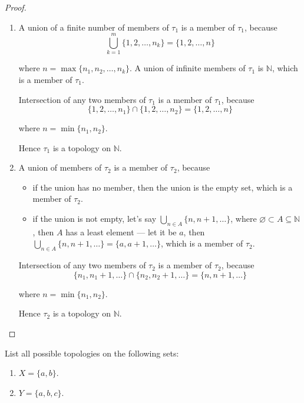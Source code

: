 \begin{proof}
	\begin{enumerate}[label={(\roman*)}]
		\item A union of a finite number of members of $\tau_{1}$ is a member of $\tau_{1}$, because
		      \[
			      \bigcup^{m}_{k=1} \{ 1, 2, \ldots, n_{k} \} = \{ 1, 2, \ldots, n \}
		      \]

		      where $n = \max\{ n_{1}, n_{2}, \ldots, n_{k} \}$. A union of infinite members of $\tau_{1}$ is $\mathbb{N}$, which is a member of $\tau_{1}$.

		      Intersection of any two members of $\tau_{1}$ is a member of $\tau_{1}$, because
		      \[
			      \{ 1, 2, \ldots, n_{1} \} \cap \{ 1, 2, \ldots, n_{2} \} = \{ 1, 2, \ldots, n \}
		      \]

		      where $n = \min\{ n_{1}, n_{2} \}$.

		      Hence $\tau_{1}$ is a topology on $\mathbb{N}$.
		\item A union of members of $\tau_{2}$ is a member of $\tau_{2}$, because
		      \begin{itemize}
			      \item if the union has no member, then the union is the empty set, which is a member of $\tau_{2}$.
			      \item if the union is not empty, let's say $\bigcup_{n\in A} \{ n, n + 1, \ldots \}$, where $\varnothing\subset A\subseteq \mathbb{N}$, then $A$ has a least element --- let it be $a$, then $\bigcup_{n\in A} \{ n, n + 1, \ldots \} = \{ a, a+1, \ldots \}$, which is a member of $\tau_{2}$.
		      \end{itemize}

		      Intersection of any two members of $\tau_{2}$ is a member of $\tau_{2}$, because
		      \[
			      \{ n_{1}, n_{1} + 1, \ldots \}\cap \{ n_{2}, n_{2} + 1, \ldots \} = \{ n, n+1, \ldots \}
		      \]

		      where $n = \min\{ n_{1}, n_{2} \}$.

		      Hence $\tau_{2}$ is a topology on $\mathbb{N}$.
	\end{enumerate}
\end{proof}
\newpage

\begin{exercise}
	List all possible topologies on the following sets:
	\begin{enumerate}[label={(\alph*)}]
		\item $X = \{ a, b \}$.
		\item $Y = \{ a, b, c \}$.
	\end{enumerate}
\end{exercise}

